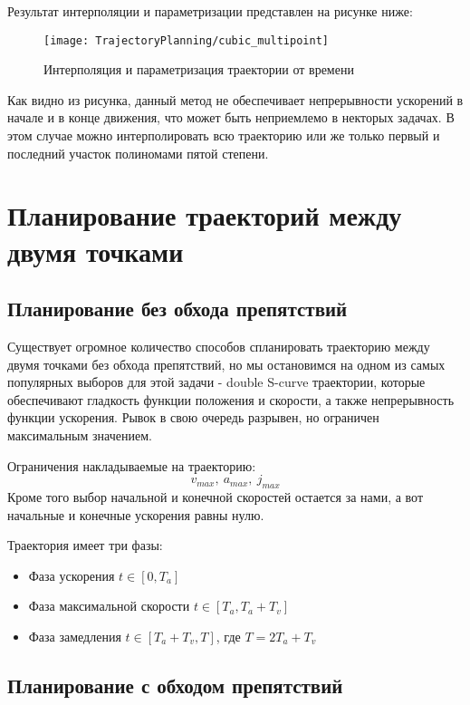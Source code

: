 Результат интерполяции и параметризации представлен на рисунке ниже:
\begin{figure}[ht]
	\centering
	\texttt{[image: TrajectoryPlanning/cubic\_multipoint]}
	\caption{Интерполяция и параметризация траектории от времени}
\end{figure}

Как видно из рисунка, данный метод не обеспечивает непрерывности ускорений в начале и в конце движения, что может быть неприемлемо в некторых задачах. В этом случае можно интерполировать всю траекторию или же только первый и последний участок полиномами пятой степени.


\section{Планирование траекторий между двумя точками} \label{sect2_3}

\subsection{Планирование без обхода препятствий} \label{subsect2_3_1}
	Существует огромное количество способов спланировать траекторию между двумя точками без обхода препятствий, но мы остановимся на одном из самых популярных выборов для этой задачи - double S-curve траектории, которые обеспечивают гладкость функции положения и скорости, а также непрерывность функции ускорения. Рывок в свою очередь разрывен, но ограничен максимальным значением.

	Ограничения накладываемые на траекторию:
	\[v_{max},\ a_{max},\ j_{max} \]
	Кроме того выбор начальной и конечной скоростей остается за нами, а вот начальные и конечные ускорения равны нулю.
	
	Траектория имеет три фазы:
	\begin{itemize}
		\item Фаза ускорения $t \in [0,T_{a}]$
		\item Фаза максимальной скорости $t \in [T_{a}, T_{a} + T_{v}]$
		\item Фаза замедления $t \in [T_{a} + T_{v}, T]$, где $T = 2T_{a} + T_{v}$
	\end{itemize}

\subsection{Планирование с обходом препятствий}	\label{subsect2_3_2}